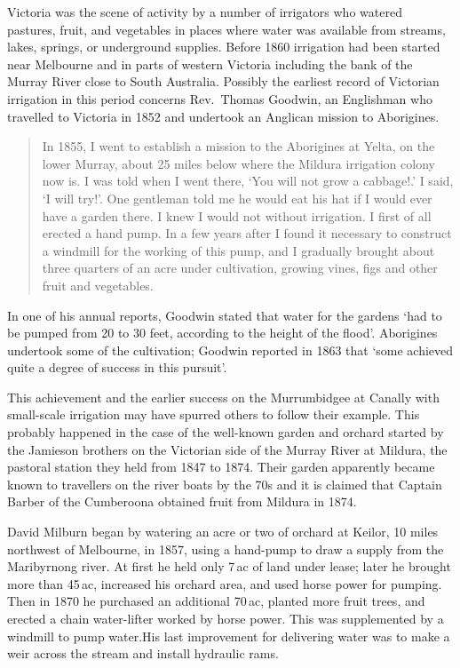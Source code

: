 Victoria was the scene of activity by a number of irrigators who
watered pastures, fruit, and vegetables in places where water was
available from streams, lakes, springs, or underground supplies.
Before 1860 irrigation had been started near Melbourne and in parts of
western Victoria including the bank of the Murray River close to South
Australia.  Possibly the earliest record of Victorian irrigation in
this period concerns Rev.\ Thomas Goodwin, an Englishman who travelled
to Victoria in 1852 and undertook an Anglican mission to
Aborigines.
\begin{quote}
	In 1855, I went to establish a mission to the Aborigines at
	Yelta, on the lower Murray, about 25 miles below where the
	Mildura irrigation colony now is.  I was told when I went
	there, `You will not grow a cabbage!.'  I said, `I will try!'.
	One gentleman told me he would eat his hat if I would ever
	have a garden there.  I knew I would not without irrigation.
	I first of all erected a hand pump.  In a few years after I
	found it necessary to construct a windmill for the working of
	this pump, and I gradually brought about three quarters of an
	acre under cultivation, growing vines, figs and other fruit
	and vegetables.
\end{quote}

In one of his annual reports, Goodwin stated that water for the
gardens `had to be pumped from 20 to 30 feet, according to the height
of the flood'.  Aborigines undertook some of the cultivation; Goodwin
reported in 1863 that `some achieved quite a degree of success in this
pursuit'.

This achievement and the earlier success on the Murrumbidgee at
Canally with small-scale irrigation may have spurred others to follow
their example.  This probably happened in the case of the well-known
garden and orchard started by the Jamieson brothers on the Victorian
side of the Murray River at Mildura, the pastoral station they held
from 1847 to 1874.  Their garden apparently became known to travellers
on the river boats by the 70s and it is claimed that Captain Barber of
the Cumberoona obtained fruit from Mildura in
1874.

David Milburn began by watering an acre or two of orchard at Keilor,
10 miles northwest of Melbourne, in 1857, using a hand-pump to draw a
supply from the Maribyrnong river.  At first he held only 7\,ac of
land under lease; later he brought more than 45\,ac, increased his
orchard area, and used horse power for pumping.  Then in 1870 he
purchased an additional 70\,ac, planted more fruit trees, and erected
a chain water-lifter worked by horse power.  This was supplemented by
a windmill to pump water.His last improvement for delivering
water was to make a weir across the stream and install hydraulic
rams.

